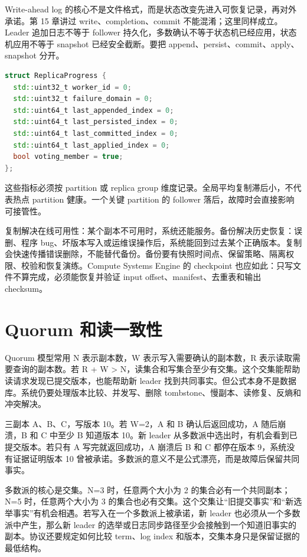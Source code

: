 Write-ahead log 的核心不是文件格式，而是状态改变先进入可恢复记录，再对外承诺。第 15 章讲过 write、completion、commit 不能混淆；这里同样成立。Leader 追加日志不等于 follower 持久化，多数确认不等于状态机已经应用，状态机应用不等于 snapshot 已经安全截断。要把 append、persist、commit、apply、snapshot 分开。

\begin{lstlisting}[language=C++,caption={副本进度摘要}]
struct ReplicaProgress {
  std::uint32_t worker_id = 0;
  std::uint32_t failure_domain = 0;
  std::uint64_t last_appended_index = 0;
  std::uint64_t last_persisted_index = 0;
  std::uint64_t last_committed_index = 0;
  std::uint64_t last_applied_index = 0;
  bool voting_member = true;
};
\end{lstlisting}

这些指标必须按 partition 或 replica group 维度记录。全局平均复制滞后小，不代表热点 partition 健康。一个关键 partition 的 follower 落后，故障时会直接影响可接管性。

复制解决在线可用性：某个副本不可用时，系统还能服务。备份解决历史恢复：误删、程序 bug、坏版本写入或运维误操作后，系统能回到过去某个正确版本。复制会快速传播错误删除，不能替代备份。备份要有快照时间点、保留策略、隔离权限、校验和恢复演练。Compute Systems Engine 的 checkpoint 也应如此：只写文件不算完成，必须能恢复并验证 input offset、manifest、去重表和输出 checksum。

\section{Quorum 和读一致性}

Quorum 模型常用 N 表示副本数，W 表示写入需要确认的副本数，R 表示读取需要查询的副本数。若 R + W > N，读集合和写集合至少有交集。这个交集能帮助读请求发现已提交版本，也能帮助新 leader 找到共同事实。但公式本身不是数据库。系统仍要处理版本比较、并发写、删除 tombstone、慢副本、读修复、反熵和冲突解决。

三副本 A、B、C，写版本 10。若 W=2，A 和 B 确认后返回成功，A 随后崩溃，B 和 C 中至少 B 知道版本 10。新 leader 从多数派中选出时，有机会看到已提交版本。若只有 A 写完就返回成功，A 崩溃后 B 和 C 都停在版本 9，系统没有证据证明版本 10 曾被承诺。多数派的意义不是公式漂亮，而是故障后保留共同事实。

多数派的核心是交集。N=3 时，任意两个大小为 2 的集合必有一个共同副本；N=5 时，任意两个大小为 3 的集合也必有交集。这个交集让“旧提交事实”和“新选举事实”有机会相遇。若写入在一个多数派上被承诺，新 leader 也必须从一个多数派中产生，那么新 leader 的选举或日志同步路径至少会接触到一个知道旧事实的副本。协议还要规定如何比较 term、log index 和版本，交集本身只是保留证据的最低结构。

